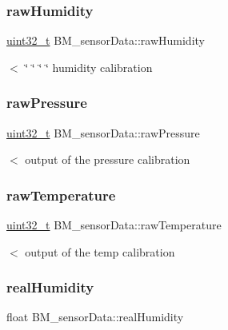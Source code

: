 \subsubsection{\texorpdfstring{raw\+Humidity}{rawHumidity}}
{\footnotesize\ttfamily \hyperlink{vl53l0x__types_8h_a435d1572bf3f880d55459d9805097f62}{uint32\+\_\+t} B\+M\+\_\+sensor\+Data\+::raw\+Humidity}

$<$ \char`\"{}    \char`\"{} \char`\"{}    \char`\"{} humidity calibration \mbox{\label{structBM__sensorData_a1f2b1f5547b72be0682ea296ba63144c}} 
\subsubsection{\texorpdfstring{raw\+Pressure}{rawPressure}}
{\footnotesize\ttfamily \hyperlink{vl53l0x__types_8h_a435d1572bf3f880d55459d9805097f62}{uint32\+\_\+t} B\+M\+\_\+sensor\+Data\+::raw\+Pressure}

$<$ output of the pressure calibration \mbox{\label{structBM__sensorData_a59c55713af263f1533b9b2481f2af860}} 
\subsubsection{\texorpdfstring{raw\+Temperature}{rawTemperature}}
{\footnotesize\ttfamily \hyperlink{vl53l0x__types_8h_a435d1572bf3f880d55459d9805097f62}{uint32\+\_\+t} B\+M\+\_\+sensor\+Data\+::raw\+Temperature}

$<$ output of the temp calibration \mbox{\label{structBM__sensorData_ab1aac1511aef5fe07ecddf763329c038}} 
\subsubsection{\texorpdfstring{real\+Humidity}{realHumidity}}
{\footnotesize\ttfamily float B\+M\+\_\+sensor\+Data\+::real\+Humidity}

